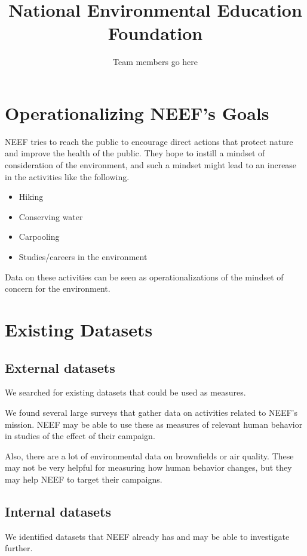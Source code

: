 \documentclass{article}
\title{National Environmental Education Foundation}
\author{Team members go here}
\begin{document}
\maketitle
{}

\section{Operationalizing NEEF's Goals}
NEEF tries to reach the public to encourage direct actions that protect nature and improve the health of the public.
They hope to instill a mindset of consideration of the environment, and such a mindset might lead to an increase
in the activities like the following.
\begin{itemize}
\item Hiking
\item Conserving water
\item Carpooling
\item Studies/careers in the environment
\end{itemize}

Data on these activities can be seen as operationalizations of the mindset of concern for the environment.

\section{Existing Datasets}

\subsection{External datasets}
We searched for existing datasets that could be used as measures.

We found several large surveys that
gather data on activities related to NEEF's mission.
NEEF may be able to use these as measures of
relevant human behavior in studies of the effect of their campaign.

Also, there are a lot of environmental data on brownfields or air quality.
These may not be very helpful for measuring how human behavior changes,
but they may help NEEF to target their campaigns.

\subsection{Internal datasets}
We identified datasets that NEEF already has and may be able to investigate further.
\end{document}
